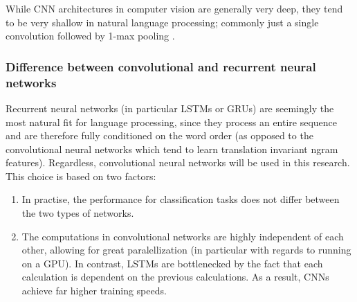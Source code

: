 While CNN architectures in computer vision are generally very deep, they tend to
be very shallow in natural language processing; commonly just a single
convolution followed by 1-max pooling \citep{zhang2015conv}. 

\subsubsection{Difference between convolutional and recurrent neural networks}
Recurrent neural networks (in particular LSTMs or GRUs) are seemingly the most
natural fit for language processing, since they process an entire sequence and
are therefore fully conditioned on the word order (as opposed to the
convolutional neural networks which tend to learn translation invariant ngram
features). Regardless, convolutional neural networks will be used in this
research. This choice is based on two factors:
\begin{enumerate}
\item In practise, the performance for classification tasks does not differ
  between the two types of networks.\citep{cnnrnn}
\item The computations in convolutional networks are highly independent of
  each other, allowing for great paralellization (in particular with regards to
  running on a GPU). In contrast, LSTMs are bottlenecked by the fact that each
  calculation is dependent on the previous calculations. As a result, CNNs
  achieve far higher training speeds.\citep{facebook}
\end{enumerate}

